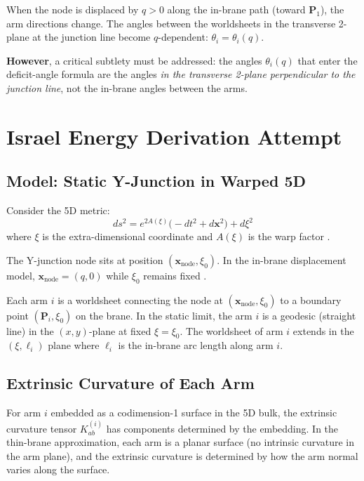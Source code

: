 When the node is displaced by $q > 0$ along the in-brane path
(toward $\mathbf{P}_1$), the arm directions change. The angles between
the worldsheets in the transverse 2-plane at the junction line become
$q$-dependent: $\theta_i = \theta_i(q)$.

\textbf{However}, a critical subtlety must be addressed: the angles
$\theta_i(q)$ that enter the deficit-angle formula are the angles
\emph{in the transverse 2-plane perpendicular to the junction line},
not the in-brane angles between the arms.

\section{Israel Energy Derivation Attempt}
\label{sec:P2WP2:derivation}

\subsection{Model: Static Y-Junction in Warped 5D}

Consider the 5D metric:
\begin{equation}
    ds^2 = e^{2A(\xi)}\bigl(-dt^2 + d\mathbf{x}^2\bigr) + d\xi^2
    \label{eq:5D_metric}
\end{equation}
where $\xi$ is the extra-dimensional coordinate and $A(\xi)$ is the
warp factor \tagI.

The Y-junction node sits at position $(\mathbf{x}_{\mathrm{node}}, \xi_0)$.
In the in-brane displacement model, $\mathbf{x}_{\mathrm{node}} = (q, 0)$
while $\xi_0$ remains fixed \tagDc.

Each arm $i$ is a worldsheet connecting the node at
$(\mathbf{x}_{\mathrm{node}}, \xi_0)$ to a boundary point
$(\mathbf{P}_i, \xi_0)$ on the brane. In the static limit, the arm
$i$ is a geodesic (straight line) in the $(x, y)$-plane at fixed
$\xi = \xi_0$. The worldsheet of arm $i$ extends in the $(\xi, \ell_i)$
plane where $\ell_i$ is the in-brane arc length along arm $i$.

\subsection{Extrinsic Curvature of Each Arm}

For arm $i$ embedded as a codimension-1 surface in the 5D bulk, the
extrinsic curvature tensor $K_{ab}^{(i)}$ has components determined
by the embedding. In the thin-brane approximation, each arm is a
planar surface (no intrinsic curvature in the arm plane), and the
extrinsic curvature is determined by how the arm normal varies along
the surface.

